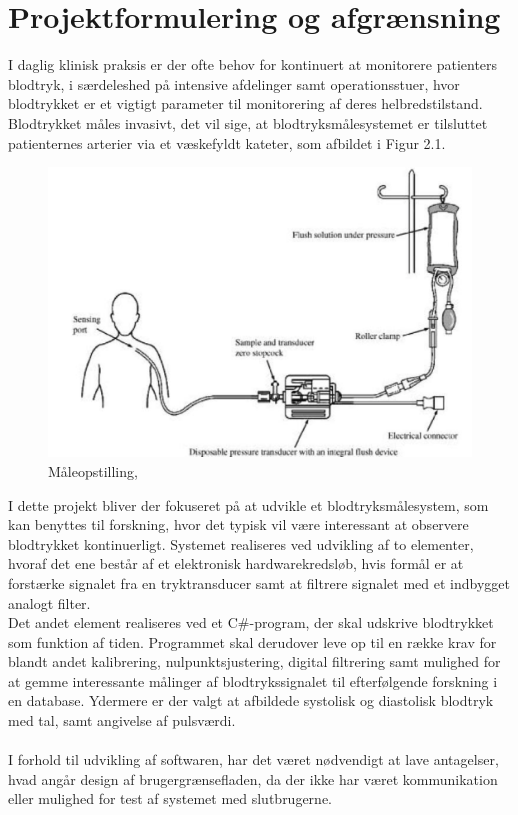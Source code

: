 \chapter{Projektformulering og afgrænsning}
I daglig klinisk praksis er der ofte behov for kontinuert at monitorere patienters blodtryk, i særdeleshed på intensive afdelinger samt operationsstuer, hvor blodtrykket er et vigtigt parameter til monitorering af deres helbredstilstand. \\
Blodtrykket måles invasivt, det vil sige, at blodtryksmålesystemet er tilsluttet patienternes arterier via et væskefyldt kateter, som afbildet i Figur 2.1.
\begin{figure}[H]
	\centering
	\includegraphics[width=1\textwidth]{Figurer/Snip20151207_50}
	\caption{Måleopstilling, \protect\cite[s. 296]{Billed for invasiv blodtryksmaling}}
\end{figure}

I dette projekt bliver der fokuseret på at udvikle et blodtryksmålesystem, som kan benyttes til forskning, hvor det typisk vil være interessant at observere blodtrykket kontinuerligt.
Systemet realiseres ved udvikling af to elementer, hvoraf det ene består af et elektronisk hardwarekredsløb, hvis formål er at forstærke signalet fra en tryktransducer samt at filtrere signalet med et indbygget analogt filter.\\
Det andet element realiseres ved et C\#-program, der skal udskrive blodtrykket som funktion af tiden. Programmet skal derudover leve op til en række krav for blandt andet kalibrering, nulpunktsjustering, digital filtrering samt mulighed for at gemme interessante målinger af blodtrykssignalet til efterfølgende forskning i en database.
Ydermere er der valgt at afbildede systolisk og diastolisk blodtryk med tal, samt angivelse af pulsværdi.\\\\
I forhold til udvikling af softwaren, har det været nødvendigt at lave antagelser, hvad angår design af brugergrænsefladen, da der ikke har været kommunikation eller mulighed for test af systemet med slutbrugerne. 

